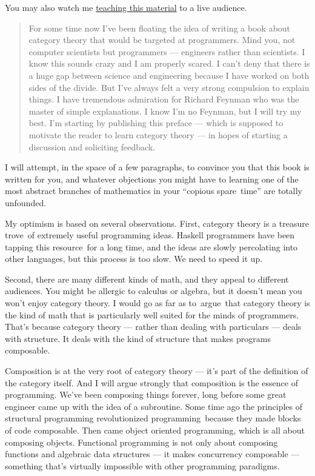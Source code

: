 You may also watch me
\href{https://www.youtube.com/playlist?list=PLbgaMIhjbmEnaH_LTkxLI7FMa2HsnawM_}{teaching
this material} to a live audience.

\begin{quote}
For some time now I've been floating the idea of writing a book about
category theory that would be targeted at programmers. Mind you, not
computer scientists but programmers --- engineers rather than
scientists. I know this sounds crazy and I am properly scared. I can't
deny that there is a huge gap between science and engineering because I
have worked on both sides of the divide. But I've always felt a very
strong compulsion to explain things. I have tremendous admiration for
Richard Feynman who was the master of simple explanations. I know I'm no
Feynman, but I will try my best. I'm starting by publishing this preface
--- which is supposed to motivate the reader to learn category theory
--- in hopes of starting a discussion and soliciting feedback.
\end{quote}

I will attempt, in the space of a few paragraphs, to convince you that
this book is written for you, and whatever objections you might have to
learning one of the most abstract branches of mathematics in your
``copious spare~time'' are totally unfounded.

My optimism is based on several observations. First, category theory is
a treasure trove~of extremely useful programming ideas. Haskell
programmers have been tapping this resource~for a long time, and the
ideas are slowly percolating into other languages, but this process is
too slow. We need to speed it up.

Second, there are many different kinds of math, and they appeal to
different audiences. You might be allergic to calculus or algebra, but
it doesn't mean you won't enjoy category theory. I would go as far as
to~argue~that category theory is the kind of math that is particularly
well suited for the minds of programmers. That's because category theory
--- rather than dealing with particulars --- deals with structure. It
deals with the kind of structure that makes programs composable.

Composition is at the very root of category theory --- it's part of the
definition of the category itself. And I will argue strongly that
composition is the essence of programming. We've been composing things
forever, long before some great engineer came up with the idea of a
subroutine. Some time ago the principles of structural programming
revolutionized programming~because they made blocks of code composable.
Then came object oriented programming, which is all about composing
objects. Functional programming is not only about composing functions
and algebraic data structures --- it makes concurrency composable ---
something that's virtually impossible with other programming paradigms.

